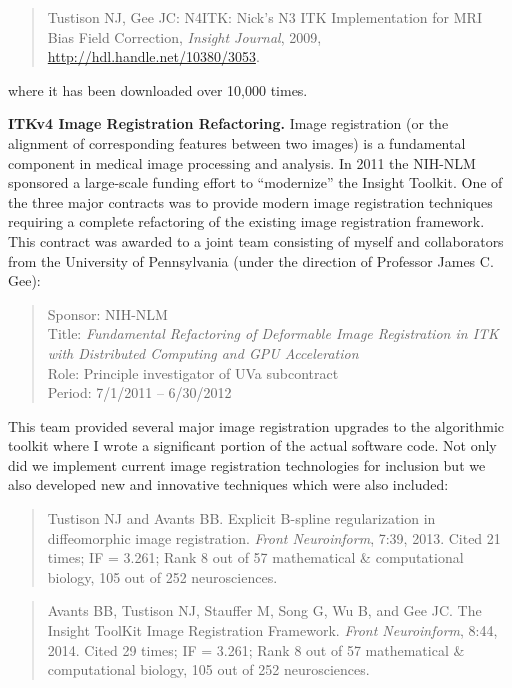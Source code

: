 \documentclass[11pt,]{article}
\begin{document}
\begin{quote}
Tustison NJ, Gee JC: N4ITK: Nick's N3 ITK Implementation for MRI Bias
Field Correction, \emph{Insight Journal}, 2009,
\url{http://hdl.handle.net/10380/3053}.
\end{quote}

where it has been downloaded over 10,000 times.

\textbf{ITKv4 Image Registration Refactoring.} Image registration (or
the alignment of corresponding features between two images) is a
fundamental component in medical image processing and analysis. In 2011
the NIH-NLM sponsored a large-scale funding effort to ``modernize'' the
Insight Toolkit. One of the three major contracts was to provide modern
image registration techniques requiring a complete refactoring of the
existing image registration framework. This contract was awarded to a
joint team consisting of myself and collaborators from the University of
Pennsylvania (under the direction of Professor James C. Gee):

\begin{quote}
Sponsor: NIH-NLM\\
Title: \emph{Fundamental Refactoring of Deformable Image Registration in
ITK with Distributed Computing and GPU Acceleration}\\
Role: Principle investigator of UVa subcontract\\
Period: 7/1/2011 -- 6/30/2012
\end{quote}

This team provided several major image registration upgrades to the
algorithmic toolkit where I wrote a significant portion of the actual
software code. Not only did we implement current image registration
technologies for inclusion but we also developed new and innovative
techniques which were also included:

\begin{quote}
Tustison NJ and Avants BB. Explicit B-spline regularization in
diffeomorphic image registration. \emph{Front Neuroinform}, 7:39, 2013.
Cited 21 times; IF = 3.261; Rank 8 out of 57 mathematical \&
computational biology, 105 out of 252 neurosciences.
\end{quote}

\begin{quote}
Avants BB, Tustison NJ, Stauffer M, Song G, Wu B, and Gee JC. The
Insight ToolKit Image Registration Framework. \emph{Front Neuroinform},
8:44, 2014. Cited 29 times; IF = 3.261; Rank 8 out of 57 mathematical \&
computational biology, 105 out of 252 neurosciences.
\end{quote}
\end{document}
